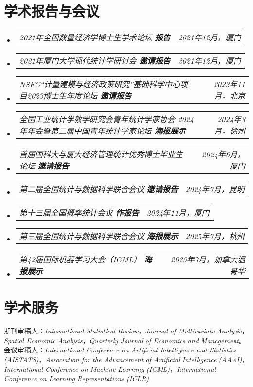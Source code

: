 \documentclass[letterpaper,10pt]{article}
\makeatletter
\newcommand{\resumeSubSubheading}[2]{
    \item
    \begin{tabular*}{0.97\textwidth}{l@{\extracolsep{\fill}}r}
      \textit{\small#1} & \textit{\small #2} \\
    \end{tabular*}\vspace{-7pt}
}
\newcommand{\resumeSubHeadingListStart}{\begin{itemize}[leftmargin=0.15in, label={}]}
\newcommand{\resumeSubHeadingListEnd}{\end{itemize}}
\makeatother
\begin{document}
\section{学术报告与会议}
\resumeSubHeadingListStart
    \resumeSubSubheading
        {{2021年全国数量经济学博士生学术论坛} \textbf{报告}}{2021年12月，厦门}
    \resumeSubSubheading
        {{2021年厦门大学现代统计学研讨会} \textbf{邀请报告}}{2021年12月，厦门}
    \resumeSubSubheading
        {{NSFC“计量建模与经济政策研究”基础科学中心项目2023博士生年度论坛} \textbf{邀请报告}}{2023年11月，北京}
    \resumeSubSubheading
        {{全国工业统计学教学研究会青年统计学家协会 2024 年年会暨第二届中国青年统计学家论坛} \textbf{海报展示}}{2024年3月，徐州}
    \resumeSubSubheading
        {{首届国科大与厦大经济管理统计优秀博士毕业生论坛} \textbf{邀请报告}}{2024年6月，厦门}
    \resumeSubSubheading
        {{第二届全国统计与数据科学联合会议} \textbf{邀请报告}}{2024年7月，昆明}
    \resumeSubSubheading
        {{第十三届全国概率统计会议} \textbf{作报告}}{2024年11月，厦门}
    \resumeSubSubheading
        {{第三届全国统计与数据科学联合会议} \textbf{海报展示}}{2025年7月，杭州}
    \resumeSubSubheading
        {{第42届国际机器学习大会（ICML）} \textbf{海报展示}}{2025年7月，加拿大温哥华}
\resumeSubHeadingListEnd


  \section{学术服务}
  期刊审稿人：\textit{International Statistical Review}，\textit{Journal of Multivariate Analysis}，\textit{Spatial Economic Analysis}，\textit{Quarterly Journal of Economics and Management}。\\
  会议审稿人：\textit{International Conference on Artificial Intelligence and Statistics (AISTATS)}，\textit{Association for the Advancement of Artificial Intelligence (AAAI)}，\textit{International Conference on Machine Learning (ICML)}，\textit{International Conference on Learning Representations (ICLR)}
\end{document}
